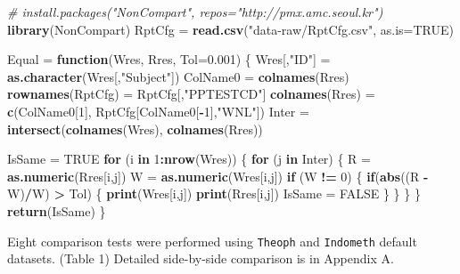 \documentclass[12pt,]{krantz}
\newenvironment{Shaded}{\begin{snugshade}}{\end{snugshade}}
\newcommand{\CommentTok}[1]{\textcolor[rgb]{0.56,0.35,0.01}{\textit{#1}}}
\newcommand{\ControlFlowTok}[1]{\textcolor[rgb]{0.13,0.29,0.53}{\textbf{#1}}}
\newcommand{\DataTypeTok}[1]{\textcolor[rgb]{0.13,0.29,0.53}{#1}}
\newcommand{\DecValTok}[1]{\textcolor[rgb]{0.00,0.00,0.81}{#1}}
\newcommand{\FloatTok}[1]{\textcolor[rgb]{0.00,0.00,0.81}{#1}}
\newcommand{\KeywordTok}[1]{\textcolor[rgb]{0.13,0.29,0.53}{\textbf{#1}}}
\newcommand{\NormalTok}[1]{#1}
\newcommand{\OperatorTok}[1]{\textcolor[rgb]{0.81,0.36,0.00}{\textbf{#1}}}
\newcommand{\OtherTok}[1]{\textcolor[rgb]{0.56,0.35,0.01}{#1}}
\newcommand{\StringTok}[1]{\textcolor[rgb]{0.31,0.60,0.02}{#1}}
\begin{document}
\begin{Shaded}
\begin{Highlighting}[]
\CommentTok{# install.packages("NonCompart", repos="http://pmx.amc.seoul.kr")}
\KeywordTok{library}\NormalTok{(NonCompart)}
\NormalTok{RptCfg =}\StringTok{ }\KeywordTok{read.csv}\NormalTok{(}\StringTok{"data-raw/RptCfg.csv"}\NormalTok{, }\DataTypeTok{as.is=}\OtherTok{TRUE}\NormalTok{)}

\NormalTok{Equal =}\StringTok{ }\ControlFlowTok{function}\NormalTok{(Wres, Rres, }\DataTypeTok{Tol=}\FloatTok{0.001}\NormalTok{)}
\NormalTok{\{}
\NormalTok{  Wres[,}\StringTok{"ID"}\NormalTok{] =}\StringTok{ }\KeywordTok{as.character}\NormalTok{(Wres[,}\StringTok{"Subject"}\NormalTok{])}
\NormalTok{  ColName0 =}\StringTok{ }\KeywordTok{colnames}\NormalTok{(Rres)}
  \KeywordTok{rownames}\NormalTok{(RptCfg) =}\StringTok{ }\NormalTok{RptCfg[,}\StringTok{"PPTESTCD"}\NormalTok{]}
  \KeywordTok{colnames}\NormalTok{(Rres) =}\StringTok{ }\KeywordTok{c}\NormalTok{(ColName0[}\DecValTok{1}\NormalTok{], RptCfg[ColName0[}\OperatorTok{-}\DecValTok{1}\NormalTok{],}\StringTok{"WNL"}\NormalTok{])}
\NormalTok{  Inter =}\StringTok{ }\KeywordTok{intersect}\NormalTok{(}\KeywordTok{colnames}\NormalTok{(Wres), }\KeywordTok{colnames}\NormalTok{(Rres))}
  
\NormalTok{  IsSame =}\StringTok{ }\OtherTok{TRUE}
  \ControlFlowTok{for}\NormalTok{ (i }\ControlFlowTok{in} \DecValTok{1}\OperatorTok{:}\KeywordTok{nrow}\NormalTok{(Wres)) \{}
    \ControlFlowTok{for}\NormalTok{ (j }\ControlFlowTok{in}\NormalTok{ Inter) \{}
\NormalTok{      R =}\StringTok{ }\KeywordTok{as.numeric}\NormalTok{(Rres[i,j])}
\NormalTok{      W =}\StringTok{ }\KeywordTok{as.numeric}\NormalTok{(Wres[i,j])}
      \ControlFlowTok{if}\NormalTok{ (W }\OperatorTok{!=}\StringTok{ }\DecValTok{0}\NormalTok{) \{}
        \ControlFlowTok{if}\NormalTok{(}\KeywordTok{abs}\NormalTok{((R }\OperatorTok{-}\StringTok{ }\NormalTok{W)}\OperatorTok{/}\NormalTok{W) }\OperatorTok{>}\StringTok{ }\NormalTok{Tol) \{}
          \KeywordTok{print}\NormalTok{(Wres[i,j])}
          \KeywordTok{print}\NormalTok{(Rres[i,j])}
\NormalTok{          IsSame =}\StringTok{ }\OtherTok{FALSE}
\NormalTok{        \}}
\NormalTok{      \}}
\NormalTok{    \}}
\NormalTok{  \}}
  \KeywordTok{return}\NormalTok{(IsSame)}
\NormalTok{\}}
\end{Highlighting}
\end{Shaded}

Eight comparison tests were performed using \texttt{Theoph} and \texttt{Indometh} default datasets. (Table 1)
Detailed side-by-side comparison is in Appendix A.
\end{document}
